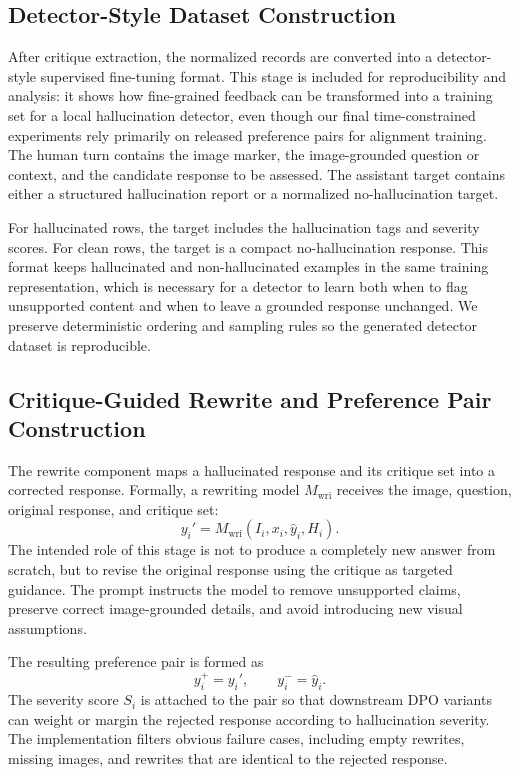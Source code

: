 \documentclass{article}
\begin{document}
\subsection{Detector-Style Dataset Construction}

After critique extraction, the normalized records are converted into a detector-style supervised fine-tuning format. This stage is included for reproducibility and analysis: it shows how fine-grained feedback can be transformed into a training set for a local hallucination detector, even though our final time-constrained experiments rely primarily on released preference pairs for alignment training. The human turn contains the image marker, the image-grounded question or context, and the candidate response to be assessed. The assistant target contains either a structured hallucination report or a normalized no-hallucination target.

For hallucinated rows, the target includes the hallucination tags and severity scores. For clean rows, the target is a compact no-hallucination response. This format keeps hallucinated and non-hallucinated examples in the same training representation, which is necessary for a detector to learn both when to flag unsupported content and when to leave a grounded response unchanged. We preserve deterministic ordering and sampling rules so the generated detector dataset is reproducible.

\subsection{Critique-Guided Rewrite and Preference Pair Construction}

The rewrite component maps a hallucinated response and its critique set into a corrected response. Formally, a rewriting model $M_{\mathrm{wri}}$ receives the image, question, original response, and critique set:
\begin{equation}
y_i' = M_{\mathrm{wri}}(I_i, x_i, \hat{y}_i, H_i).
\end{equation}
The intended role of this stage is not to produce a completely new answer from scratch, but to revise the original response using the critique as targeted guidance. The prompt instructs the model to remove unsupported claims, preserve correct image-grounded details, and avoid introducing new visual assumptions.

The resulting preference pair is formed as
\begin{equation}
y_i^+ = y_i', \qquad y_i^- = \hat{y}_i.
\end{equation}
The severity score $S_i$ is attached to the pair so that downstream DPO variants can weight or margin the rejected response according to hallucination severity. The implementation filters obvious failure cases, including empty rewrites, missing images, and rewrites that are identical to the rejected response.
\end{document}
